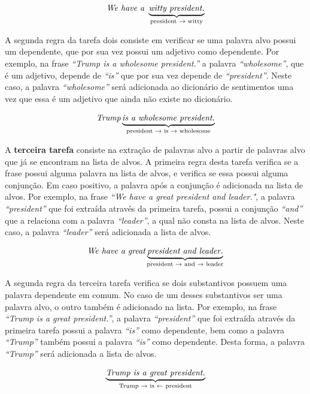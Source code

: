 \[\textit{We have a } \underbrace{\textit{witty president.}}_\text{president
\textrightarrow \text{ witty}}\]

A segunda regra da tarefa dois
consiste em verificar se uma palavra alvo possui um dependente, que por sua vez
possui um adjetivo como dependente. Por exemplo, na frase
\textit{``Trump is a wholesome president.''} a palavra \textit{``wholesome''}, que é um
adjetivo, depende de \textit{``is''} que por sua vez depende de
\textit{``president''}. Neste caso, a palavra \textit{``wholesome''}
será adicionada ao dicionário de sentimentos uma vez que essa é um adjetivo que
ainda não existe no dicionário.

\[\textit{Trump} \underbrace{\textit{is a wholesome president.}}_\text{president
\textrightarrow \text{ is} \textrightarrow \text{ wholesome}}\]

A \textbf{terceira tarefa} consiste na extração de palavras alvo a partir de
palavras alvo que já se encontram na lista de alvos. A primeira regra desta
tarefa verifica se a frase possui alguma palavra na lista de alvos, e verifica se essa possui alguma
conjunção. Em caso positivo, a palavra após a conjunção é adicionada na lista
de alvos. Por exemplo, na frase \textit{``We have a great president and
leader."}, a palavra \textit{``president''} que foi extraída através
da primeira tarefa, possui a conjunção \textit{``and''} que a relaciona com a
palavra \textit{``leader''}, a qual não consta na lista de alvos. Neste
caso, a palavra \textit{``leader''} será adicionada a lista de alvos.


\[\textit{We have a great} \underbrace{\textit{president and
leader.}}_\text{president \textrightarrow \text{ and} \textrightarrow \text{
leader}}\]

A segunda regra da terceira tarefa verifica se dois substantivos
possuem uma palavra dependente em comum. No caso de um desses substantivos ser
uma palavra alvo, o outro também é adicionado na lista. Por exemplo, na frase
\textit{``Trump is a great president.''}, a palavra \textit{``president''} que
foi extraída através da primeira tarefa possui a palavra \textit{``is''} como
dependente, bem como a palavra \textit{``Trump''} também possui a palavra
\textit{``is''} como dependente. Desta forma, a palavra \textit{``Trump''} será adicionada a
lista de alvos.

\[\underbrace{\textit{Trump is a great president.}}_\text{Trump
\textrightarrow \text{ is} \textleftarrow \text{ president}}\]



